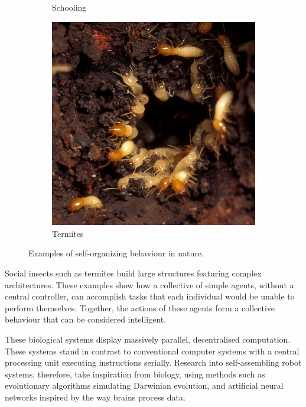 \begin{figure}[H]
\begin{subfigure}[b]{0.31\textwidth}
		\caption{Schooling\cite{polyglottus_mockingbird-tales-readings--animal-behavior-5.1.pdf_2011}}
	\end{subfigure}
	\begin{subfigure}[b]{0.31\textwidth}
		\label{fig:social-insects}
		\centering
		\includegraphics[height=\linewidth]{chapters/res/Termites_rush_to_damaged_portion_of_mound_edit.jpg}
		\caption{Termites\cite{bauer_termites_rush_to_damaged_portion_of_mound.jpg_2007}}
	\end{subfigure}
	\caption{Examples of self-organizing behaviour in nature.}
	\label{fig:collective-behaviour}
\end{figure}

Social insects such as termites build large structures featuring complex architectures.
These examples show how a collective of simple agents, without a central controller, can accomplish tasks that each individual would be unable to perform themselves. 
Together, the actions of these agents form a collective behaviour that can be considered intelligent.  

These biological systems display massively parallel, decentralised computation.
These systems stand in contrast to conventional computer systems with a central processing unit executing instructions serially.
Research into self-assembling robot systems, therefore, take inspiration from biology, using methods such as evolutionary algorithms simulating Darwinian evolution, and artificial neural networks inspired by the way brains process data.




